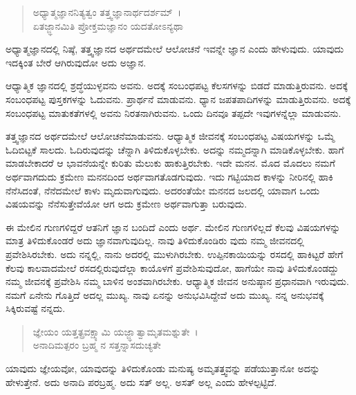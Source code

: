 \begin{verse}
ಅಧ್ಯಾತ್ಮಜ್ಞಾನನಿತ್ಯತ್ವಂ ತತ್ತ್ವಜ್ಞಾನಾರ್ಥದರ್ಶಮ್~।\\ಏತಜ್ಜ್ಞಾನಮಿತಿ ಪ್ರೋಕ್ತಮಜ್ಞಾನಂ ಯದತೋಽನ್ಯಥಾ 
\end{verse}

{\small ಅಧ್ಯಾತ್ಮಜ್ಞಾನದಲ್ಲಿ ನಿಷ್ಠೆ, ತತ್ತ್ವಜ್ಞಾನದ ಅರ್ಥದಮೇಲೆ ಆಲೋಚನೆ ಇವನ್ನೇ ಜ್ಞಾನ ಎಂದು ಹೇಳುವುದು. ಯಾವುದು ಇದಕ್ಕಿಂತ ಬೇರೆ ಆಗಿರುವುದೋ ಅದು ಅಜ್ಞಾನ.}

ಆಧ್ಯಾತ್ಮಿಕ ಜ್ಞಾನದಲ್ಲಿ ಶ್ರದ್ಧೆಯುಳ್ಳವನು ಅವನು. ಅದಕ್ಕೆ ಸಂಬಂಧಪಟ್ಟ ಕೆಲಸಗಳನ್ನು ಬಿಡದೆ ಮಾಡುತ್ತಿರುವನು. ಅದಕ್ಕೆ ಸಂಬಂಧಪಟ್ಟ ಪುಸ್ತಕಗಳನ್ನು ಓದುವನು. ಪ್ರಾರ್ಥನೆ ಮಾಡುವನು. ಧ್ಯಾನ ಜಪತಪಾದಿಗಳನ್ನು ಮಾಡುತ್ತಿರುವನು. ಅದಕ್ಕೆ ಸಂಬಂಧಪಟ್ಟ ಮಾತುಕತೆಗಳಲ್ಲಿ ಅವನು ನಿರತನಾಗಿರುವನು. ಒಂದು ದಿನವೂ ತಪ್ಪದೇ ಇವುಗಳನ್ನೆಲ್ಲಾ ಮಾಡುವನು.

ತತ್ತ್ವಜ್ಞಾನದ ಅರ್ಥದಮೇಲೆ ಆಲೋಚನೆಮಾಡುವನು. ಆಧ್ಯಾತ್ಮಿಕ ಜೀವನಕ್ಕೆ ಸಂಬಂಧಪಟ್ಟ ವಿಷಯಗಳನ್ನು ಒಮ್ಮೆ ಓದಿಬಿಟ್ಟಕೆ ಸಾಲದು. ಓದಿರುವುದನ್ನು ಚೆನ್ನಾಗಿ ತಿಳಿದುಕೊಳ್ಳಬೇಕು. ಅದನ್ನು ನಮ್ಮದನ್ನಾಗಿ ಮಾಡಿಕೊಳ್ಳಬೇಕು. ಹಾಗೆ ಮಾಡಬೇಕಾದರೆ ಆ ಭಾವನೆಯನ್ನೇ ಕುರಿತು ಮೆಲುಕು ಹಾಕುತ್ತಿರಬೇಕು. ಇದೇ ಮನನ. ಮೊದ ಮೊದಲು ನಮಗೆ ಅರ್ಥವಾಗದುದು ಕ್ರಮೇಣ ಮನನದಿಂದ ಅರ್ಥವಾಗತೊಡಗುವುದು. ಇದು ಗಟ್ಟಿಯಾದ ಕಾಳನ್ನು ನೀರಿನಲ್ಲಿ ಹಾಕಿ ನೆನೆಸಿದಂತೆ, ನೆನೆದಮೇಲೆ ಕಾಳು ಮೃದುವಾಗುವುದು. ಅದರಂತೆಯೇ ಮನನದ ಜಲದಲ್ಲಿ ಯಾವಾಗ ಒಂದು ವಿಷಯವನ್ನು ನೆನೆಸುತ್ತೇವೆಯೋ ಆಗ ಅದು ಕ್ರಮೇಣ ಅರ್ಥವಾಗುತ್ತಾ ಬರುವುದು.

ಈ ಮೇಲಿನ ಗುಣಗಳಿದ್ದರೆ ಆತನಿಗೆ ಜ್ಞಾನ ಬಂದಿದೆ ಎಂದು ಅರ್ಥ. ಮೇಲಿನ ಗುಣಗಳಿಲ್ಲದೆ ಕೆಲವು ವಿಷಯಗಳನ್ನು ಮಾತ್ರ ತಿಳಿದುಕೊಂಡರೆ ಅದು ಜ್ಞಾನವಾಗುವುದಿಲ್ಲ. ನಾವು ತಿಳಿದುಕೊಂಡಿರು ವುದು ನಮ್ಮ ಜೀವನದಲ್ಲಿ ಪ್ರವೇಶಿಸಿರಬೇಕು. ಅದು ನನ್ನಲ್ಲಿ, ನಾನು ಅದರಲ್ಲಿ ಮುಳುಗಿರಬೇಕು. ಉಪ್ಪಿನಕಾಯಿಯನ್ನು ರಸದಲ್ಲಿ ಹಾಕಿಟ್ಟರೆ ಹೇಗೆ ಕೆಲವು ಕಾಲವಾದಮೇಲೆ ರಸದಲ್ಲಿರುವುದೆಲ್ಲಾ ಕಾಯೊಳಗೆ ಪ್ರವೇಶಿಸುವುದೋ, ಹಾಗೆಯೇ ನಾವು ತಿಳಿದುಕೊಂಡದ್ದು ನಮ್ಮ ಜೀವನಕ್ಕೆ ಪ್ರವೇಶಿಸಿ ನಮ್ಮ ಬಾಳಿನ ಅಂಶವಾಗಿರಬೇಕು. ಆಧ್ಯಾತ್ಮಿಕ ಜೀವನ ಅನುಷ್ಠಾನ ಪ್ರಧಾನವಾಗಿ ಇರುವುದು. ನಮಗೆ ಏನೇನು ಗೊತ್ತಿದೆ ಅದಲ್ಲ ಮುಖ್ಯ. ನಾವು ಏನನ್ನು ಅನುಭವಿಸಿದ್ದೇವೆ ಅದು ಮುಖ್ಯ. ನನ್ನ ಅನುಭವಕ್ಕೆ ಸಿಕ್ಕಿರುವಷ್ಟೆ ನನ್ನದು.\enginline{}

\begin{verse}
ಜ್ಞೇಯಂ ಯತ್ತತ್ಪ್ರವಕ್ಷ್ಯಾಮಿ ಯಜ್ಜ್ಞಾತ್ವಾಮೃತಮಶ್ನುತೇ~।\\ಅನಾದಿಮತ್ಪರಂ ಬ್ರಹ್ಮ ನ ಸತ್ತನ್ನಾಸದುಚ್ಯತೇ 
\end{verse}

{\small ಯಾವುದು ಜ್ಞೇಯವೋ, ಯಾವುದನ್ನು ತಿಳಿದುಕೊಂಡು ಮನುಷ್ಯ ಅಮೃತತ್ತ್ವವನ್ನು ಪಡೆಯುತ್ತಾನೋ ಅದನ್ನು ಹೇಳುತ್ತೇನೆ. ಅದು ಅನಾದಿ ಪರಬ್ರಹ್ಮ. ಅದು ಸತ್ ಅಲ್ಲ. ಅಸತ್ ಅಲ್ಲ ಎಂದು ಹೇಳಲ್ಪಟ್ಟಿದೆ.}

